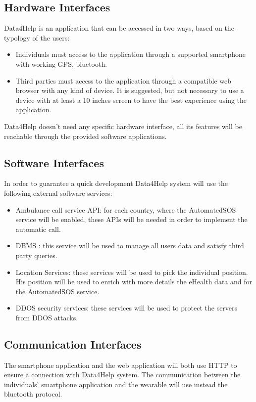 \subsection{Hardware Interfaces}
Data4Help is an application that can be accessed in two ways, based on the typology of the users:
\begin{itemize}
\item Individuals must access to the application through a supported smartphone with working GPS, bluetooth.
\item Third parties must access to the application through a compatible web browser with any kind of device. It is suggested, but not necessary to use a device with at least a 10 inches screen to have the best experience using the application.
\end{itemize}
Data4Help doesn't need any specific hardware interface, all its features will be reachable through the provided software applications.








\subsection{Software Interfaces}
In order to guarantee a quick development Data4Help system will use the following external software services:
\begin{itemize}
\item Ambulance call service API: for each country, where the AutomatedSOS service will be enabled, these APIs will be needed in order to implement the automatic call.
\item DBMS : this service will be used to manage all users data and satisfy third party queries.
\item Location Services: these services will be used to pick the individual position. His position will be used to enrich with more details the eHealth data and for the AutomatedSOS service.
\item DDOS security services: these services will be used to protect the servers from DDOS attacks.
\end{itemize}

\subsection{Communication Interfaces}
The smartphone application and the web application will both use HTTP to ensure a connection with Data4Help system.
The communication between the individuals' smartphone application and the wearable will use instead the bluetooth protocol.

